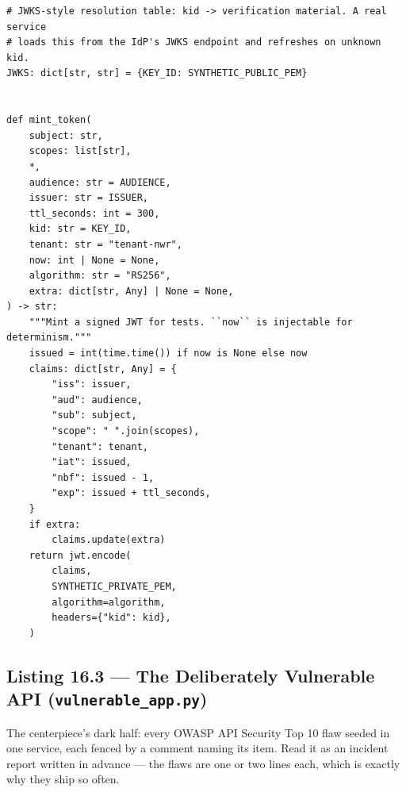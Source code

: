 \begin{verbatim}
# JWKS-style resolution table: kid -> verification material. A real service
# loads this from the IdP's JWKS endpoint and refreshes on unknown kid.
JWKS: dict[str, str] = {KEY_ID: SYNTHETIC_PUBLIC_PEM}


def mint_token(
    subject: str,
    scopes: list[str],
    *,
    audience: str = AUDIENCE,
    issuer: str = ISSUER,
    ttl_seconds: int = 300,
    kid: str = KEY_ID,
    tenant: str = "tenant-nwr",
    now: int | None = None,
    algorithm: str = "RS256",
    extra: dict[str, Any] | None = None,
) -> str:
    """Mint a signed JWT for tests. ``now`` is injectable for determinism."""
    issued = int(time.time()) if now is None else now
    claims: dict[str, Any] = {
        "iss": issuer,
        "aud": audience,
        "sub": subject,
        "scope": " ".join(scopes),
        "tenant": tenant,
        "iat": issued,
        "nbf": issued - 1,
        "exp": issued + ttl_seconds,
    }
    if extra:
        claims.update(extra)
    return jwt.encode(
        claims,
        SYNTHETIC_PRIVATE_PEM,
        algorithm=algorithm,
        headers={"kid": kid},
    )
\end{verbatim}

\subsection{Listing 16.3 --- The Deliberately Vulnerable API (\texttt{vulnerable\_app.py})}
\label{lst:ch16-vulnerable}

The centerpiece's dark half: every OWASP API Security Top 10 flaw seeded in
one service, each fenced by a comment naming its item. Read it as an
incident report written in advance --- the flaws are one or two lines each,
which is exactly why they ship so often.

